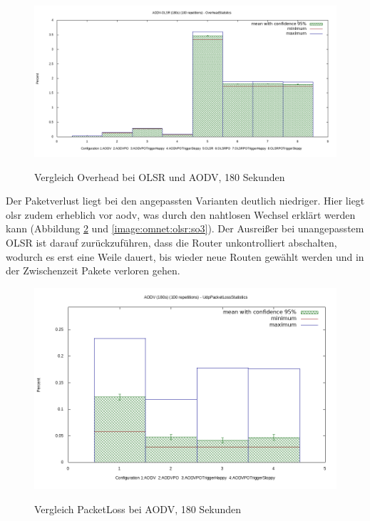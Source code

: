 \begin{figure}
  \centering
  \includegraphics[scale=0.5]{bilder/c2.png} \\
  \caption{Vergleich Overhead bei OLSR und AODV, 180 Sekunden}
  \label{image:omnet:olsr:comp2}
\end{figure}

Der Paketverlust liegt bei den angepassten Varianten deutlich niedriger. Hier liegt \gls{olsr} zudem erheblich vor \gls{aodv}, was durch den nahtlosen Wechsel erklärt werden kann (\vgl Abbildung \ref{image:omnet:olsr:sa3} und \ref{image:omnet:olsr:so3}). Der Ausreißer bei unangepasstem OLSR ist darauf zurückzuführen, dass die Router unkontrolliert abschalten, wodurch es erst eine Weile dauert, bis wieder neue Routen gewählt werden und in der Zwischenzeit Pakete verloren gehen.

\begin{figure}
  \centering
  \includegraphics[scale=0.4]{bilder/sa3.png} \\
  \caption{Vergleich PacketLoss bei AODV, 180 Sekunden}
  \label{image:omnet:olsr:sa3}
\end{figure}

